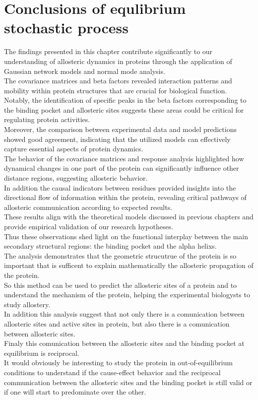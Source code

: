 \documentclass[English, Lau, oneside]{sapthesis}
\begin{document}
\section{Conclusions of equlibrium stochastic process}
\noindent 
The findings presented in this chapter contribute significantly to our understanding of allosteric dynamics in proteins through the application of Gaussian network models and normal mode analysis.\\
The covariance matrices and beta factors revealed interaction patterns and mobility within protein structures that are crucial for biological function. \\
Notably, the identification of specific peaks in the beta factors corresponding to the binding pocket and allosteric sites suggests these areas could be critical for regulating protein activities.\\
Moreover, the comparison between experimental data and model predictions showed good agreement, indicating that the utilized models can effectively capture essential aspects of protein dynamics. \\
The behavior of the covariance matrices and response analysis highlighted how dynamical changes in one part of the protein can significantly influence other distance regions, suggesting allosteric behavior. \\
In addition the causal indicators between residues provided insights into the directional flow of information within the protein, revealing critical pathways of allosteric communication according to expected results.\\
These results align with the theoretical models discussed in previous chapters and provide empirical validation of our research hypotheses.\\
Thus these observations shed light on the functional interplay between the main secondary structural regions:  the binding pocket and the alpha helixs.\\
The analysis demonstrates that the geometric strucutrue of the protein is so important that is sufficent to explain mathematically the allosteric propagation of the protein.\\
So this method can be used to predict the allosteric sites of a protein and to understand the mechanism of the protein, helping the experimental biologysts to study allostery.\\
In addition this analysis suggest that not only there is a comunication between allosteric sites and active sites in protein, but also there is a comunication between allosteric sites.\\
Finaly this comunication between the allosteric sites and the binding pocket at equilibrium is reciprocal.\\
It would obviously be interesting to study the protein in out-of-equilibrium conditions to understand if the cause-effect behavior and the reciprocal communication between the allosteric sites and the binding pocket is still valid or if one will start to predominate over the other.
\end{document}
